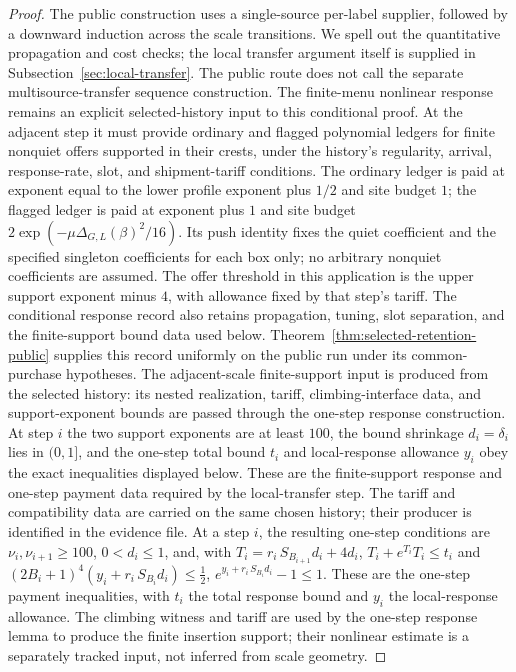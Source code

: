 \begin{proof}
The public construction uses a single-source per-label supplier, followed by a downward induction across the scale transitions. We spell out the quantitative propagation and cost checks; the local transfer argument itself is supplied in Subsection~\ref{sec:local-transfer}. The public route does not call the separate multisource-transfer sequence construction. The finite-menu nonlinear response remains an explicit selected-history input to this conditional proof. At the adjacent step it must provide ordinary and flagged polynomial ledgers for finite nonquiet offers supported in their crests, under the history’s regularity, arrival, response-rate, slot, and shipment-tariff conditions. The ordinary ledger is paid at exponent equal to the lower profile exponent plus $1/2$ and site budget $1$; the flagged ledger is paid at exponent plus $1$ and site budget $2\exp(-\mu\Delta_{G,L}(\beta)^2/16)$. Its push identity fixes the quiet coefficient and the specified singleton coefficients for each box only; no arbitrary nonquiet coefficients are assumed. The offer threshold in this application is the upper support exponent minus $4$, with allowance fixed by that step’s tariff. The conditional response record also retains propagation, tuning, slot separation, and the finite-support bound data used below. Theorem~\ref{thm:selected-retention-public} supplies this record
uniformly on the public run under its common-purchase hypotheses. The adjacent-scale finite-support input is produced from the selected history: its nested realization, tariff, climbing-interface data, and support-exponent bounds are passed through the one-step response construction. At step $i$ the two support exponents are at least $100$, the bound shrinkage $d_i=\delta_i$ lies in $(0,1]$, and the one-step total bound $t_i$ and local-response allowance $y_i$ obey the exact inequalities displayed below. These are the finite-support response and one-step payment data required by the local-transfer step. The tariff and compatibility data are carried on the same chosen history; their producer is identified in the evidence file. At a step $i$, the resulting one-step conditions are $\nu_i,\nu_{i+1}\geq100$, $0<d_i\leq1$, and, with $T_i=r_i\,S_{B_{i+1}}d_i+4d_i$, $T_i+e^{T_i}T_i\leq t_i$ and $ (2B_i+1)^4(y_i+r_i\,S_{B_i}d_i)\leq\tfrac12$, $e^{y_i+r_i\,S_{B_i}d_i}-1\leq1$. These are the one-step payment inequalities, with $t_i$ the total response bound and $y_i$ the local-response allowance. The climbing witness and tariff are used by the one-step response lemma to produce the finite insertion support; their nonlinear estimate is a separately tracked input, not inferred from scale geometry.


\end{proof}
